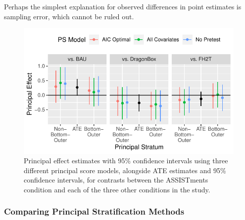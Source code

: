\documentclass[]{article}
\begin{document}
Perhaps the simplest explanation for observed differences in point estimates is sampling error, which cannot be ruled out.

\begin{figure}
  \centering
  \includegraphics{prinEffs.pdf}
  \caption{Principal effect estimates with 95\% confidence intervals using three different principal score models, alongside ATE estimates and 95\% confidence intervals, for contrasts between the ASSISTments condition and each of the three other conditions in the study.}
  \label{fig:effects}
\end{figure}

\subsubsection{Comparing Principal Stratification Methods}



\end{document}
